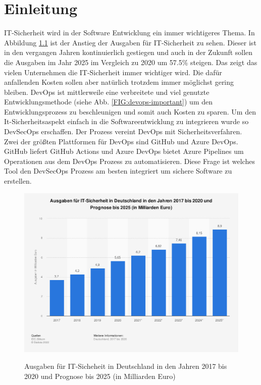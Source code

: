 \chapter{Einleitung}
IT-Sicherheit wird in der Software Entwicklung ein immer wichtigeres  Thema. In Abbildung \ref{FIG:statistic-ausgaben-it-sicherheit} ist der Anstieg der Ausgaben für IT-Sicherheit zu sehen. Dieser ist in den vergangen Jahren kontinuierlich gestiegen und auch in der Zukunft sollen die Ausgaben im Jahr 2025 im Vergleich zu 2020 um 57.5\% steigen. Das zeigt das vielen Unternehmen die IT-Sicherheit immer wichtiger wird. Die dafür anfallenden Kosten sollen aber natürlich trotzdem immer möglichst gering bleiben.
DevOps ist mittlerweile eine verbreitete und viel genutzte Entwicklungsmethode (siehe Abb. \ref{FIG:devops-important}) um den Entwicklungsprozess zu beschleunigen und somit auch Kosten zu sparen. Um den It-Sicherheitsaspekt einfach in die Softwareentwicklung zu integrieren wurde so DevSecOps erschaffen. Der Prozess vereint DevOps mit Sicherheitsverfahren. \cite{security-model}
Zwei der größten Plattformen für DevOps sind GitHub und Azure DevOps. GitHub liefert GitHub Actions und Azure DevOps bietet Azure Pipelines um Operationen aus dem DevOps Prozess zu automatisieren. Diese Frage ist welches Tool den DevSecOps Prozess am besten integriert um sichere Software zu erstellen.


\begin{figure}[H]
	{\caption{Ausgaben für IT-Sicheheit in Deutschland in den Jahren 2017 bis 2020 und Prognose bis 2025 (in Milliarden Euro)}
		\label{FIG:statistic-ausgaben-it-sicherheit}}
	{\includegraphics[width=1\textwidth]{figures/statistic-ausgaben-it-sicherheit.png}}
\end{figure}

